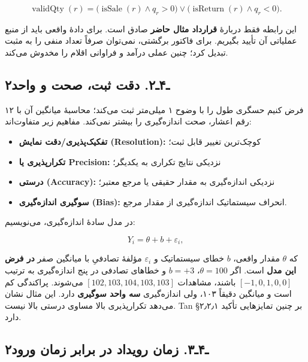\documentclass[12pt,a4paper,oneside]{book}
\providecommand{\tightlist}{\setlength{\itemsep}{0pt}\setlength{\parskip}{0pt}}
\begin{document}
\[
\operatorname{validQty}(r)=
\bigl(\operatorname{isSale}(r)\land q_r>0\bigr)
\lor
\bigl(\operatorname{isReturn}(r)\land q_r<0\bigr).
\]

این رابطه فقط دربارهٔ \textbf{قرارداد مثال حاضر} صادق است. برای دادهٔ واقعی باید از منبع عملیاتی آن تأیید بگیریم. برای فاکتور برگشتی، نمی‌توان صرفاً تعداد منفی را به مثبت تبدیل کرد؛ چنین عملی درآمد و فراوانی اقلام را مخدوش می‌کند.

\subsection{۲ـ۴ـ۲. دقت ثبت، صحت و واحد}\label{ux640ux6f4ux640ux6f2.-ux62fux642ux62a-ux62bux628ux62a-ux635ux62dux62a-ux648-ux648ux627ux62dux62f}

فرض کنیم حسگری طول را با وضوح ۱ میلی‌متر ثبت می‌کند؛ محاسبهٔ میانگین آن با ۱۲ رقم اعشار، صحت اندازه‌گیری را بیشتر نمی‌کند. مفاهیم زیر متفاوت‌اند:

\begin{itemize}
\tightlist
\item
  \textbf{تفکیک‌پذیری/دقت نمایش (Resolution):} کوچک‌ترین تغییر قابل ثبت؛
\item
  \textbf{تکرارپذیری یا Precision:} نزدیکی نتایج تکراری به یکدیگر؛
\item
  \textbf{درستی (Accuracy):} نزدیکی اندازه‌گیری به مقدار حقیقی یا مرجع معتبر؛
\item
  \textbf{سوگیری اندازه‌گیری (Bias):} انحراف سیستماتیک اندازه‌گیری از مقدار مرجع.
\end{itemize}

در مدل سادهٔ اندازه‌گیری، می‌نویسیم:

\[
Y_i=\theta+b+\varepsilon_i,
\]

که \(\theta\) مقدار واقعی، \(b\) خطای سیستماتیک و \(\varepsilon_i\) مؤلفهٔ تصادفیِ با میانگین صفر \textbf{در فرض این مدل} است. اگر \(\theta=100\)، \(b=+3\) و خطاهای تصادفی در پنج اندازه‌گیری به ترتیب \([-1,0,1,0,0]\) باشند، مشاهدات \([102,103,104,103,103]\) می‌شوند. پراکندگی کم است و میانگین دقیقاً ۱۰۳، ولی اندازه‌گیری \textbf{سه واحد سوگیری} دارد. این مثال نشان می‌دهد تکرارپذیری بالا مساوی درستی بالا نیست. Tan §۲٫۲٫۱ بر چنین تمایزهایی تأکید دارد.

\subsection{۲ـ۴ـ۳. زمان رویداد در برابر زمان ورود}\label{ux640ux6f4ux640ux6f3.-ux632ux645ux627ux646-ux631ux648ux6ccux62fux627ux62f-ux62fux631-ux628ux631ux627ux628ux631-ux632ux645ux627ux646-ux648ux631ux648ux62f}
\end{document}
